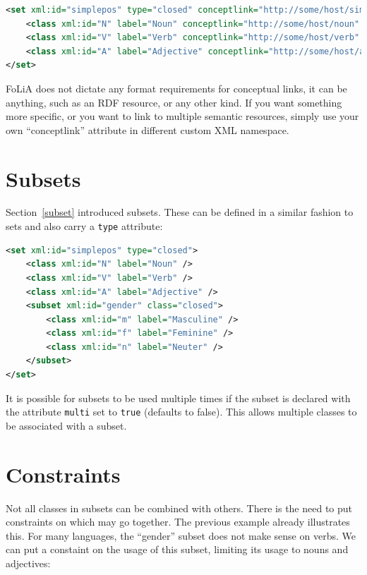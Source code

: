\documentclass[a4paper,12pt]{report}
\begin{document}
\begin{lstlisting}[language=xml]
<set xml:id="simplepos" type="closed" conceptlink="http://some/host/simplepos">
    <class xml:id="N" label="Noun" conceptlink="http://some/host/noun" />
    <class xml:id="V" label="Verb" conceptlink="http://some/host/verb" />
    <class xml:id="A" label="Adjective" conceptlink="http://some/host/adj" />
</set>
\end{lstlisting}

FoLiA does not dictate any format requirements for conceptual links, it can be anything, such as an RDF resource, or any other kind. If you want something more specific, or you want to link to multiple semantic resources, simply use your own ``conceptlink'' attribute in different custom XML namespace.

\section{Subsets}

Section~\ref{subset} introduced subsets. These can be defined in a similar fashion to sets and also carry a \texttt{type} attribute:

\begin{lstlisting}[language=xml]
<set xml:id="simplepos" type="closed">
    <class xml:id="N" label="Noun" />
    <class xml:id="V" label="Verb" />
    <class xml:id="A" label="Adjective" />   
    <subset xml:id="gender" class="closed">
        <class xml:id="m" label="Masculine" />    
        <class xml:id="f" label="Feminine" />
        <class xml:id="n" label="Neuter" />
    </subset>
</set>
\end{lstlisting}

It is possible for subsets to be used multiple times if the subset is declared with the attribute \texttt{multi} set to \texttt{true} (defaults to false). This allows multiple classes to be associated with a subset.

\section{Constraints}

Not all classes in subsets can be combined with others. There is the need to put constraints on which may go together. The previous example already illustrates this. For many languages, the ``gender'' subset does not make sense on verbs. We can put a constaint on the usage of this subset, limiting its usage to nouns and adjectives:
\end{document}
